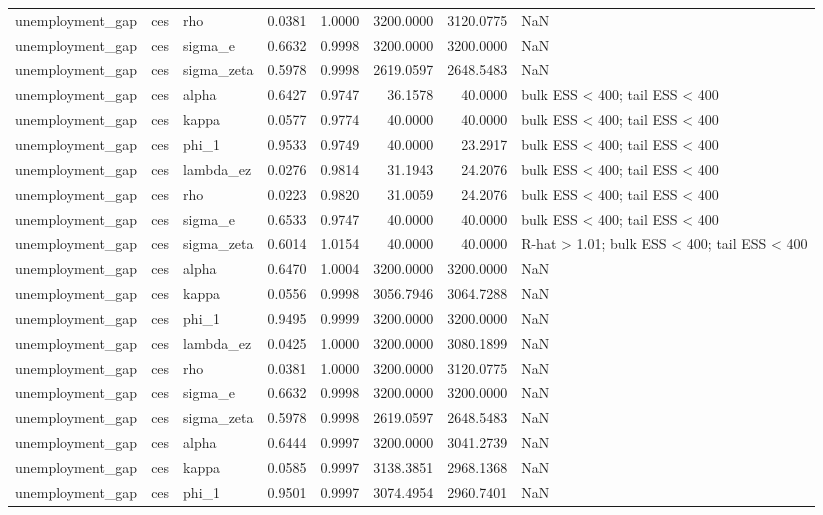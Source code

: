 \begin{tabular}{lllrrrrl}
unemployment\_gap & ces & rho & 0.0381 & 1.0000 & 3200.0000 & 3120.0775 & NaN \\
unemployment\_gap & ces & sigma\_e & 0.6632 & 0.9998 & 3200.0000 & 3200.0000 & NaN \\
unemployment\_gap & ces & sigma\_zeta & 0.5978 & 0.9998 & 2619.0597 & 2648.5483 & NaN \\
unemployment\_gap & ces & alpha & 0.6427 & 0.9747 & 36.1578 & 40.0000 & bulk ESS < 400; tail ESS < 400 \\
unemployment\_gap & ces & kappa & 0.0577 & 0.9774 & 40.0000 & 40.0000 & bulk ESS < 400; tail ESS < 400 \\
unemployment\_gap & ces & phi\_1 & 0.9533 & 0.9749 & 40.0000 & 23.2917 & bulk ESS < 400; tail ESS < 400 \\
unemployment\_gap & ces & lambda\_ez & 0.0276 & 0.9814 & 31.1943 & 24.2076 & bulk ESS < 400; tail ESS < 400 \\
unemployment\_gap & ces & rho & 0.0223 & 0.9820 & 31.0059 & 24.2076 & bulk ESS < 400; tail ESS < 400 \\
unemployment\_gap & ces & sigma\_e & 0.6533 & 0.9747 & 40.0000 & 40.0000 & bulk ESS < 400; tail ESS < 400 \\
unemployment\_gap & ces & sigma\_zeta & 0.6014 & 1.0154 & 40.0000 & 40.0000 & R-hat > 1.01; bulk ESS < 400; tail ESS < 400 \\
unemployment\_gap & ces & alpha & 0.6470 & 1.0004 & 3200.0000 & 3200.0000 & NaN \\
unemployment\_gap & ces & kappa & 0.0556 & 0.9998 & 3056.7946 & 3064.7288 & NaN \\
unemployment\_gap & ces & phi\_1 & 0.9495 & 0.9999 & 3200.0000 & 3200.0000 & NaN \\
unemployment\_gap & ces & lambda\_ez & 0.0425 & 1.0000 & 3200.0000 & 3080.1899 & NaN \\
unemployment\_gap & ces & rho & 0.0381 & 1.0000 & 3200.0000 & 3120.0775 & NaN \\
unemployment\_gap & ces & sigma\_e & 0.6632 & 0.9998 & 3200.0000 & 3200.0000 & NaN \\
unemployment\_gap & ces & sigma\_zeta & 0.5978 & 0.9998 & 2619.0597 & 2648.5483 & NaN \\
unemployment\_gap & ces & alpha & 0.6444 & 0.9997 & 3200.0000 & 3041.2739 & NaN \\
unemployment\_gap & ces & kappa & 0.0585 & 0.9997 & 3138.3851 & 2968.1368 & NaN \\
unemployment\_gap & ces & phi\_1 & 0.9501 & 0.9997 & 3074.4954 & 2960.7401 & NaN \\

\end{tabular}
